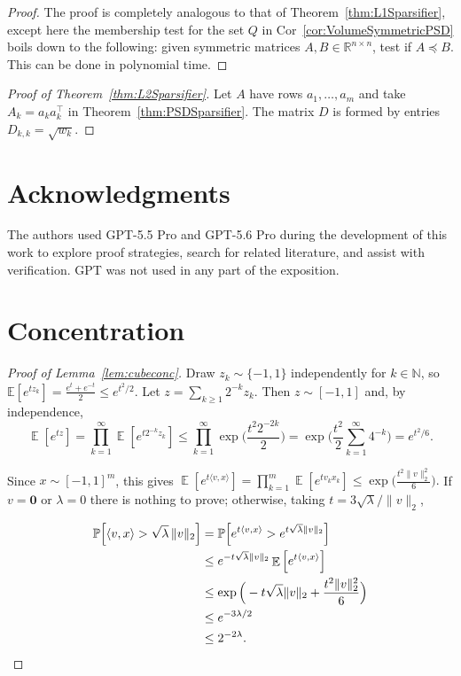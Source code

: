 \documentclass[12pt,english]{article}
\theoremstyle{theorem}
\theoremstyle{remark}
\providecommand{\setR}{\mathbb{R}}
\newcommand{\E}{\mathop{\mathbb{E}}}
\begin{document}
\begin{proof}
  The proof is completely analogous to that of Theorem~\ref{thm:L1Sparsifier}, except here the membership test for the set $Q$ in Cor~\ref{cor:VolumeSymmetricPSD} boils down to the
  following: given symmetric matrices $A,B \in \setR^{n \times n}$, test if $A \preceq B$. This can be done in polynomial time.
\end{proof}

\begin{proof}[Proof of Theorem~\ref{thm:L2Sparsifier}] Let $A$ have rows $a_1, \dots, a_m$ and take $A_k = a_k a_k^\top$ in Theorem~\ref{thm:PSDSparsifier}. The matrix $D$ is formed by entries $D_{k,k} = \sqrt{w_k}$.
\end{proof}

\section{Acknowledgments}

The authors used GPT-5.5 Pro and GPT-5.6 Pro during the development of this work to explore proof strategies, search for related literature, and assist with verification. GPT was not used in any part of the exposition. 




\appendix

\section{Concentration\label{sec:AppendixA}}

\begin{proof}[Proof of Lemma~\ref{lem:cubeconc}]
 Draw $z_k \sim \{-1,1\}$ independently for $k \in \mathbb{N}$, so $\mathbb E[e^{t z_k}] =\frac{e^t+e^{-t}}{2} \le e^{t^2/2}$. Let $z=\sum_{k \ge 1} 2^{-k} z_k$. Then $z \sim [-1,1]$ and, by independence,
\[
    \E [e^{tz}] =\prod_{k=1}^\infty \E[e^{t 2^{-k}z_k}] \le \prod_{k=1}^\infty \exp\Big(\frac{t^2 2^{-2k}}{2}\Big) =\exp\Big(\frac{t^2}{2}\sum_{k=1}^\infty 4^{-k}\Big)=e^{t^2/6}.
\]

Since $x \sim [-1,1]^m$, this gives $
    \displaystyle \E[e^{t \langle v, x \rangle}] = \prod_{k=1}^m \E[e^{tv_k x_k}] \le \exp\Big(\frac{t^2\|v\|_2^2}{6}\Big).
$ If $v = \mathbf{0}$ or $\lambda = 0$ there is nothing to prove; otherwise, taking $t = 3 \sqrt{\lambda}/\|v\|_2$,

\[
\begin{aligned}
\mathbb{P}\Big[\langle v,x\rangle > \sqrt{\lambda}\,\|v\|_2\Big]
&= \mathbb{P}\Big[e^{t\langle v,x\rangle}
    > e^{t\sqrt{\lambda}\|v\|_2}\Big] \\
&\le e^{-t\sqrt{\lambda}\|v\|_2}
    \E\Big[e^{t\langle v,x\rangle}\Big] \\
&\le \exp\Big(
    -t\sqrt{\lambda}\|v\|_2
    + \frac{t^2\|v\|_2^2}{6}
\Big) \\
&\le e^{-3\lambda/2}\\
& \le 2^{-2\lambda}. \qedhere
\end{aligned}
\]
\end{proof}
\end{document}

